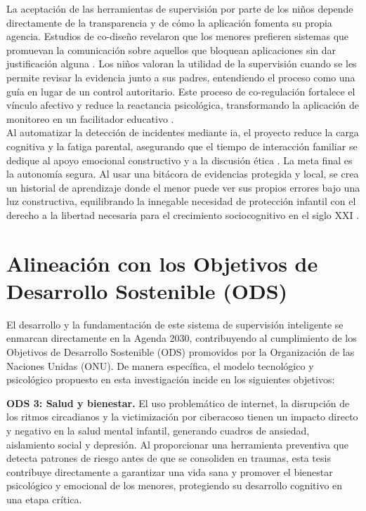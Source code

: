 La aceptación de las herramientas de supervisión por parte de los niños depende directamente de la transparencia y de cómo la aplicación fomenta su propia agencia. Estudios de co-diseño revelaron que los menores prefieren sistemas que promuevan la comunicación sobre aquellos que bloquean aplicaciones sin dar justificación alguna \cite{mcnally_co-designing_2018, holmarsdottir_integrative_2025}. Los niños valoran la utilidad de la supervisión cuando se les permite revisar la evidencia junto a sus padres, entendiendo el proceso como una guía en lugar de un control autoritario. Este proceso de co-regulación fortalece el vínculo afectivo y reduce la reactancia psicológica, transformando la aplicación de monitoreo en un facilitador educativo \cite{chowdhury_landscape_2025, liverpool_engaging_2020}. \\

Al automatizar la detección de incidentes mediante \gls{ia}, el proyecto reduce la carga cognitiva y la fatiga parental, asegurando que el tiempo de interacción familiar se dedique al apoyo emocional constructivo y a la discusión ética \cite{stoilova_parental_2024, ayyash_cybersecurity_2024, koulaxidis_improving_2022}. La meta final es la autonomía segura. Al usar una bitácora de evidencias protegida y local, se crea un historial de aprendizaje donde el menor puede ver sus propios errores bajo una luz constructiva, equilibrando la innegable necesidad de protección infantil con el derecho a la libertad necesaria para el crecimiento sociocognitivo en el siglo XXI \cite{agbana_ethical_2025, balapour_mobile_2020}. \\

\section{Alineación con los Objetivos de Desarrollo Sostenible (ODS)}

El desarrollo y la fundamentación de este sistema de supervisión inteligente se enmarcan directamente en la Agenda 2030, contribuyendo al cumplimiento de los Objetivos de Desarrollo Sostenible (ODS) promovidos por la Organización de las Naciones Unidas (ONU). De manera específica, el modelo tecnológico y psicológico propuesto en esta investigación incide en los siguientes objetivos:

\textbf{ODS 3: Salud y bienestar.} El uso problemático de internet, la disrupción de los ritmos circadianos y la victimización por ciberacoso tienen un impacto directo y negativo en la salud mental infantil, generando cuadros de ansiedad, aislamiento social y depresión. Al proporcionar una herramienta preventiva que detecta patrones de riesgo antes de que se consoliden en traumas, esta tesis contribuye directamente a garantizar una vida sana y promover el bienestar psicológico y emocional de los menores, protegiendo su desarrollo cognitivo en una etapa crítica.

